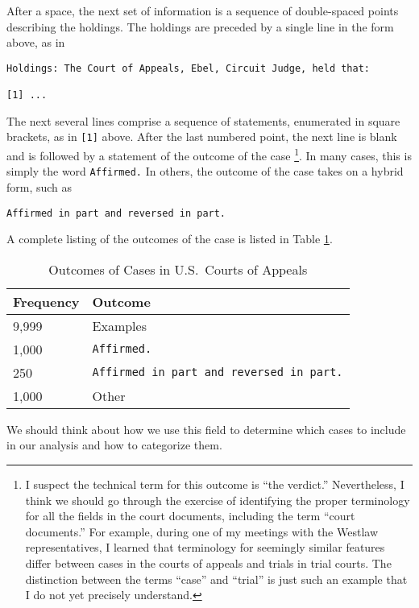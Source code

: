 \documentclass[11pt]{paper}
\begin{document}
After a space, the next set of information is 
a sequence of double-spaced points describing the holdings. 
The holdings are preceded by a single line in the form above, as in 
% 
\begin{verbatim}
Holdings: The Court of Appeals, Ebel, Circuit Judge, held that:

[1] ...
\end{verbatim}
% 
The next several lines comprise a sequence of statements, 
enumerated in square brackets, as in \texttt{[1]} above. 
After the last numbered point, the next line is blank 
and is followed by a statement of the outcome of the case%
\footnote{I suspect the technical term for this outcome is ``the verdict.'' 
Nevertheless, I think we should go through the exercise 
of identifying the proper terminology for all the fields 
in the court documents, including the term ``court documents.''
For example, during one of my meetings with the Westlaw representatives, 
I learned that terminology for seemingly similar features differ 
between cases in the courts of appeals and trials in trial courts. 
The distinction between the terms ``case'' and ``trial'' is just such an example
that I do not yet precisely understand.}. 
In many cases, this is simply the word \texttt{Affirmed.}
In others, the outcome of the case takes on a hybrid form, such as
% 
\begin{verbatim}
Affirmed in part and reversed in part.
\end{verbatim}
% 
A complete listing of the outcomes of the case is listed in 
Table \ref{tab:outcome_list}. 
% 
\begin{table}[ht]
\centering
\begin{tabular}{l l}
  \hline
	Frequency 	& Outcome \\ 
  \hline
  	9,999 		& Examples \\ 
  	1,000 		& \texttt{Affirmed.} \\ 
	   250 		& \texttt{Affirmed in part and reversed in part.} \\ 
  	1,000 		& Other \\ 
   \hline
\end{tabular}
\caption{Outcomes of Cases in U.S.~Courts of Appeals} 
\label{tab:outcome_list}
\end{table}
% 
We should think about how we use this field 
to determine which cases to include in our analysis and how to categorize them. 
\end{document}
